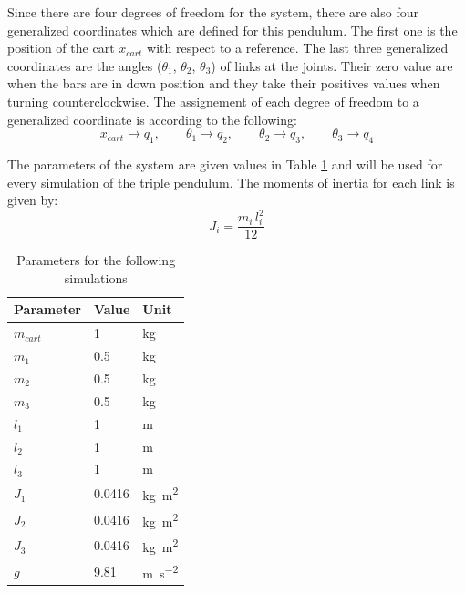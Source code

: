 \documentclass[a4paper,12pt,twoside]{article}
\begin{document}
Since there are four degrees of freedom for the system, there are also four generalized coordinates which are defined for this pendulum. The first one is the position of the cart $x_{cart}$ with respect to a reference. The last three generalized coordinates are the angles ($\theta_1$, $\theta_2$, $\theta_3$) of links at the joints. Their zero value are when the bars are in down position and they take their positives values when turning counterclockwise. The assignement of each degree of freedom to a generalized coordinate is according to the following:
\[
	x_{cart}\to q_1, \qquad \theta_1\to q_2, \qquad \theta_2\to q_3, \qquad \theta_3\to q_4
\]

The parameters of the system are given values in Table \ref{tab:parameters_system} and will be used for every simulation of the triple pendulum. The moments of inertia for each link is given by:
\[J_i = \frac{m_i\,l_i^2}{12}\]
\begin{table}[H]
	\centering
	\caption{Parameters for the following simulations}
	\label{tab:parameters_system}
	\begin{tabular}{@{}lll@{}}
		\toprule
		Parameter  & Value  & Unit                         \\ \midrule
		$m_{cart}$ & 1      & kg                           \\
		$m_1$      & 0.5    & kg                           \\
		$m_2$      & 0.5    & kg                           \\
		$m_3$      & 0.5    & kg                           \\
		$l_1$      & 1      & m                            \\
		$l_2$      & 1      & m                            \\
		$l_3$      & 1      & m                            \\
		$J_1$      & 0.0416 & \si{\kilo\gram\square\metre} \\
		$J_2$      & 0.0416 & \si{\kilo\gram\square\metre} \\
		$J_3$      & 0.0416 & \si{\kilo\gram\square\metre} \\
		$g$        & 9.81   & \si{m\per\square\second}     \\ \bottomrule
	\end{tabular}
\end{table}
\end{document}
